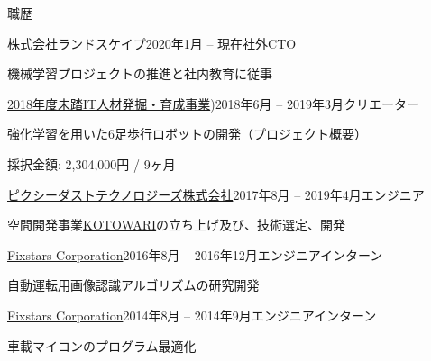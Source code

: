\documentclass{resume} %
\begin{document}
\begin{rSection}{職歴}

    \begin{rSubsection}{\href{https://www.landscape.co.jp/}{株式会社ランドスケイプ}}{2020年1月 -- 現在}{社外CTO}{}
    \item 機械学習プロジェクトの推進と社内教育に従事
    \end{rSubsection}

    \begin{rSubsection}{\href{https://www.mitou.org/}{2018年度未踏IT人材発掘・育成事業})}{2018年6月 -- 2019年3月}{クリエーター}{}
    \item 強化学習を用いた6足歩行ロボットの開発（\href{https://www.ipa.go.jp/jinzai/mitou/2018/gaiyou_tn-1}{プロジェクト概要}）
    \item 採択金額: 2,304,000円 / 9ヶ月
    \end{rSubsection}

    \begin{rSubsection}{\href{http://pixiedusttech.com/}{ピクシーダストテクノロジーズ株式会社}}{2017年8月 -- 2019年4月}{エンジニア}{}
    \item 空間開発事業\href{https://pixiedusttech.com/kotowari/}{KOTOWARI}の立ち上げ及び、技術選定、開発
    \end{rSubsection}

    \begin{rSubsection}{\href{https://www.fixstars.com/en/}{Fixstars Corporation}}{2016年8月 -- 2016年12月}{エンジニアインターン}{}
    \item 自動運転用画像認識アルゴリズムの研究開発
    \end{rSubsection}

    \begin{rSubsection}{\href{https://www.fixstars.com/en/}{Fixstars Corporation}}{2014年8月 -- 2014年9月}{エンジニアインターン}{}
    \item 車載マイコンのプログラム最適化
    \end{rSubsection}

\end{rSection}

\end{document}
